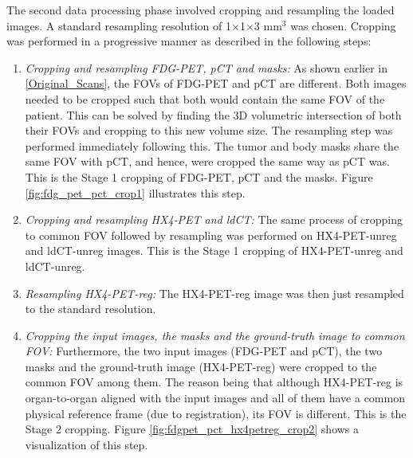 The second data processing phase involved cropping and resampling the loaded images. A standard resampling resolution of 1$\times$1$\times$3 mm$^3$ was chosen. Cropping was performed in a progressive manner as described in the following steps: 

\begin{enumerate}
    \item \textit{Cropping and resampling FDG-PET, pCT and masks:} As shown earlier in \ref{Original_Scans}, the FOVs of FDG-PET and pCT are different. Both images needed to be cropped such that both would contain the same FOV of the patient. This can be solved by finding the 3D volumetric intersection of both their FOVs and cropping to this new volume size. The resampling step was performed immediately following this. The tumor and body masks share the same FOV with pCT, and hence, were cropped the same way as pCT was. This is the Stage 1 cropping of FDG-PET, pCT and the masks. Figure \ref{fig:fdg_pet_pct_crop1} illustrates this step.

    \item \textit{Cropping and resampling HX4-PET and ldCT:} The same process of cropping to common FOV followed by resampling was performed on HX4-PET-unreg and ldCT-unreg images. This is the Stage 1 cropping of HX4-PET-unreg and ldCT-unreg.

    \item \textit{Resampling HX4-PET-reg:} The HX4-PET-reg image was then just resampled to the standard resolution.

    \item \textit{Cropping the input images, the masks and the ground-truth image to common FOV:} Furthermore, the two input images (FDG-PET and pCT), the two masks and the ground-truth image (HX4-PET-reg) were cropped to the common FOV among them. The reason being that although HX4-PET-reg is organ-to-organ aligned with the input images and all of them have a common physical reference frame (due to registration), its FOV is different. This is the Stage 2 cropping. Figure \ref{fig:fdgpet_pct_hx4petreg_crop2} shows a visualization of this step.
\end{enumerate}

